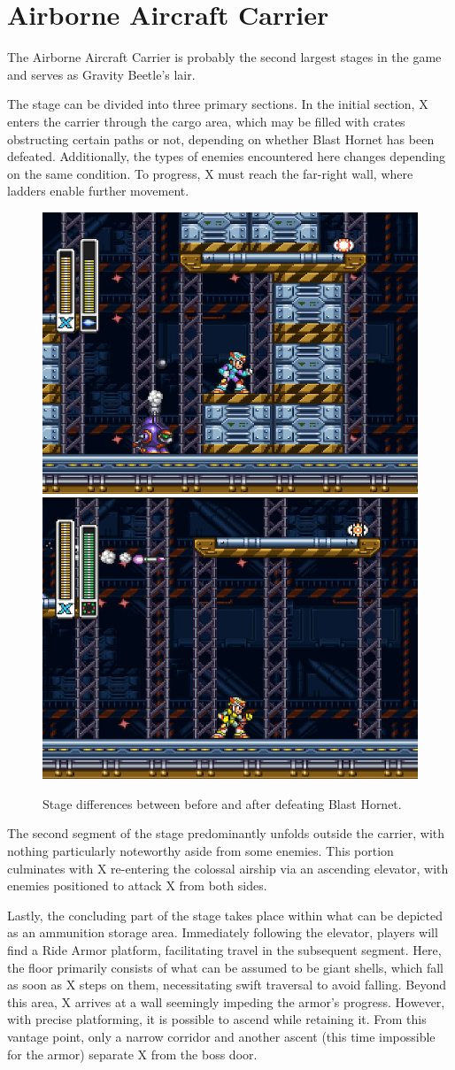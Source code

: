 \section{Airborne Aircraft Carrier}
The Airborne Aircraft Carrier is probably the second largest stages in the game and serves as Gravity Beetle's lair.

The stage can be divided into three primary sections. In the initial section, X enters the carrier through the cargo area, which may be filled with crates obstructing certain paths or not, depending on whether Blast Hornet has been defeated. Additionally, the types of enemies encountered here changes depending on the same condition. To progress, X must reach the far-right wall, where ladders enable further movement.

\begin{figure}[htp]
	\centering
	\includegraphics[width=.4\linewidth]{figures/X3/Gravity_beetle/Stage_2.jpg}
	\includegraphics[width=.4\linewidth]{figures/X3/Gravity_beetle/Stage_1.jpg}
	\caption{Stage differences between before and after defeating Blast Hornet.}
\end{figure}

The second segment of the stage predominantly unfolds outside the carrier, with nothing particularly noteworthy aside from some enemies. This portion culminates with X re-entering the colossal airship via an ascending elevator, with enemies positioned to attack X from both sides.

Lastly, the concluding part of the stage takes place within what can be depicted as an ammunition storage area. Immediately following the elevator, players will find a Ride Armor platform, facilitating travel in the subsequent segment. Here, the floor primarily consists of what can be assumed to be giant shells, which fall as soon as X steps on them, necessitating swift traversal to avoid falling. Beyond this area, X arrives at a wall seemingly impeding the armor's progress. However, with precise platforming, it is possible to ascend while retaining it. From this vantage point, only a narrow corridor and another ascent (this time impossible for the armor) separate X from the boss door.

